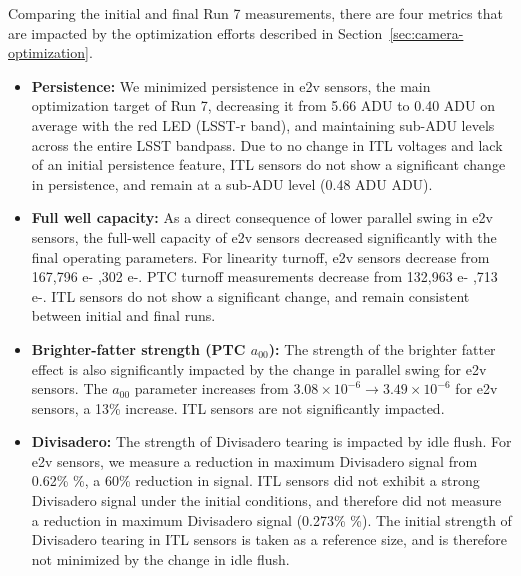 Comparing the initial and final Run 7 measurements, there are four metrics that are impacted by the optimization efforts described in Section~\ref{sec:camera-optimization}.
\begin{itemize}
  \item \textbf{Persistence:} We minimized persistence in e2v sensors, the main optimization target of Run 7, decreasing it from 5.66 ADU to 0.40 ADU on average with the red LED (LSST-r band), and maintaining sub-ADU levels across the entire LSST bandpass. Due to no change in ITL voltages and lack of an initial persistence feature, ITL sensors do not show a significant change in persistence, and remain at a sub-ADU level (0.48 ADU  ADU).
  \item \textbf{Full well capacity:} As a direct consequence of lower parallel swing in e2v sensors, the full-well capacity of e2v sensors decreased significantly with the final operating parameters. For linearity turnoff, e2v sensors decrease from 167,796 e- ,302 e-. PTC turnoff measurements decrease from 132,963 e- ,713 e-. ITL sensors do not show a significant change, and remain consistent between initial and final runs.
  \item \textbf{Brighter-fatter strength (PTC $a_{00}$):} The strength of the brighter fatter effect is also significantly impacted by the change in parallel swing for e2v sensors. The $a_{00}$ parameter increases from $3.08\times10^{-6} \rightarrow 3.49\times10^{-6}$ for e2v sensors, a 13\% increase. ITL sensors are not significantly impacted.%
  \item \textbf{Divisadero:} The strength of Divisadero tearing is impacted by idle flush. For e2v sensors, we measure a reduction in maximum Divisadero signal from 0.62\% \%, a 60\% reduction in signal. ITL sensors did not exhibit a strong Divisadero signal under the initial conditions, and therefore did not measure a reduction in maximum Divisadero signal (0.273\% \%). The initial strength of Divisadero tearing in ITL sensors is taken as a reference size, and is therefore not minimized by the change in idle flush.
\end{itemize}

